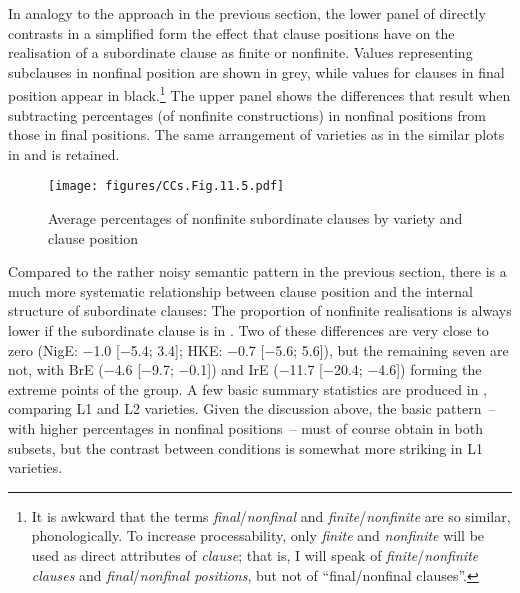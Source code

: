 In analogy to the approach in the previous section, the lower panel of  directly contrasts in a simplified form the effect that clause positions have on the realisation of a subordinate clause as finite or nonfinite. Values representing subclauses in nonfinal position are shown in grey, while values for clauses in final position appear in black.\footnote{It is awkward that the terms \textit{final}/\textit{nonfinal} and \textit{finite}/\textit{nonfinite} are so similar, phonologically. To increase processability, only \textit{finite} and \textit{nonfinite} will be used as direct attributes of \textit{clause}; that is, I will speak of \textit{finite}/\textit{nonfinite clauses} and \textit{final}/\textit{nonfinal positions}, but not of “final/nonfinal clauses”.} The upper panel shows the differences that result when subtracting percentages (of nonfinite constructions) in nonfinal positions from those in final positions. The same arrangement of varieties as in the similar plots in  and  is retained.

\begin{figure}
\texttt{[image: figures/CCs.Fig.11.5.pdf]}
\caption{\label{bkm:Ref75876706}\label{fig:11.5}Average percentages of nonfinite subordinate clauses by variety and clause position}
\end{figure}

Compared to the rather noisy semantic pattern in the previous section, there is a much more systematic relationship between clause position and the internal structure of subordinate clauses: The proportion of nonfinite realisations is always lower if the subordinate clause is in . Two of these differences are very close to zero (NigE: $-$1.0 [$-$5.4; 3.4]; HKE: $-$0.7 [$-$5.6; 5.6]), but the remaining seven are not, with BrE ($-$4.6 [$-$9.7; $-$0.1]) and IrE ($-$11.7 [$-$20.4; $-$4.6]) forming the extreme points of the group. A few basic summary statistics are produced in , comparing L1 and L2 varieties. Given the discussion above, the basic pattern~– with higher percentages in nonfinal positions~– must of course obtain in both subsets, but the contrast between conditions is somewhat more striking in L1 varieties.\largerpage[2]

